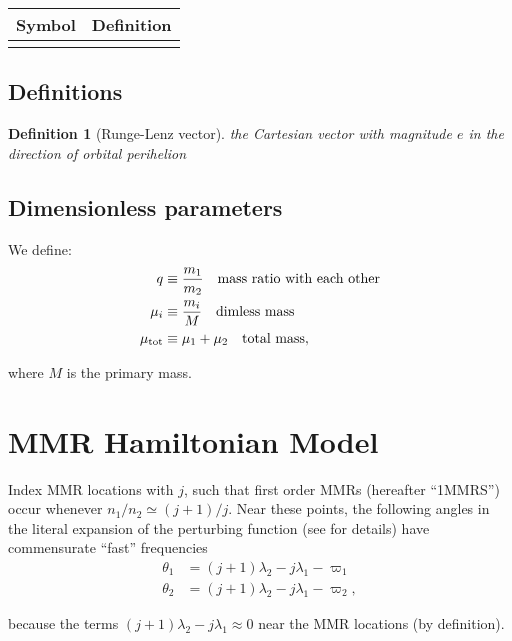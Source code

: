 \documentclass[11pt]{article}
\newtheorem{defn}{Definition}
\begin{document}
\begin{center}
\begin{tabular}{ll}
\hline
Symbol & Definition\\
\hline
 & \\
\hline
\end{tabular}
\end{center}

\subsection{Definitions}
\label{sec:orgaa7604a}
\begin{defn}[Runge-Lenz vector]
the Cartesian vector with magnitude $e$ in the
direction of orbital perihelion
\end{defn}

\subsection{Dimensionless parameters}
\label{sec:orgb1f51ec}
We define:
\begin{align}
 q&\equiv \frac{m_1}{m_2}\quad\text{mass ratio with each other}\\ 
 \mu_i&\equiv \frac{m_i}{M}\quad\text{dimless mass}\\ 
 \mu_{\rm tot}&\equiv \mu_1+\mu_2\quad\text{total mass},\\ 
\end{align}

\noindent
where \(M\) is the primary mass.

\section{MMR Hamiltonian Model}
\label{sec:org4fd2db9}
Index MMR locations with \(j\), such that first order MMRs (hereafter ``1MMRS'') occur whenever
\(n_1/n_2\simeq(j+1)/j\).
Near these points, the following angles in the literal expansion of the perturbing
function (see \cite{murray_solar_2000} for details) have commensurate ``fast'' frequencies
\begin{align}
\theta_1 &= (j+1)\lambda_2-j\lambda_1-\varpi_1\\
\theta_2 &= (j+1)\lambda_2-j\lambda_1-\varpi_2,
\end{align}

\noindent
because the terms \((j+1)\lambda_2-j\lambda_1\approx 0\) near the MMR locations (by definition).
\end{document}
